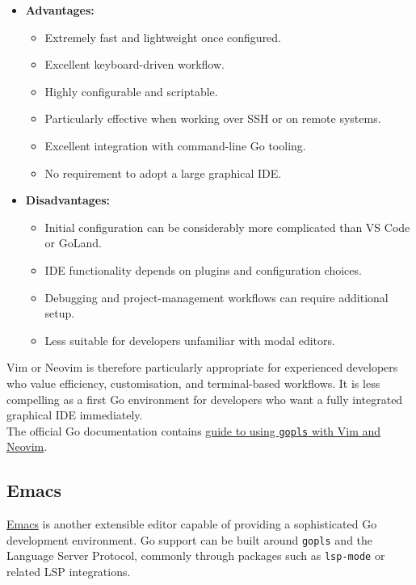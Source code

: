 \begin{itemize}
\item \textbf{Advantages:}
\begin{itemize}
\item Extremely fast and lightweight once configured.
\item Excellent keyboard-driven workflow.
\item Highly configurable and scriptable.
\item Particularly effective when working over SSH or on remote systems.
\item Excellent integration with command-line Go tooling.
\item No requirement to adopt a large graphical IDE.
\end{itemize}

\item \textbf{Disadvantages:}
\begin{itemize}
    \item Initial configuration can be considerably more complicated than VS Code or GoLand.
    \item IDE functionality depends on plugins and configuration choices.
    \item Debugging and project-management workflows can require additional setup.
    \item Less suitable for developers unfamiliar with modal editors.
\end{itemize}

\end{itemize}

Vim or Neovim is therefore particularly appropriate for experienced developers who value efficiency, customisation, and terminal-based workflows. It is less compelling as a first Go environment for developers who want a fully integrated graphical IDE immediately.\\

The official Go documentation contains 
\href{https://go.dev/gopls/editor/vim}{guide to using \texttt{gopls} with Vim and Neovim}.

\subsection{Emacs}

\href{https://www.gnu.org/software/emacs/}{Emacs} is another extensible editor capable of providing a sophisticated Go development environment. Go support can be built around \texttt{gopls} and the Language Server Protocol, commonly through packages such as \texttt{lsp-mode} or related LSP integrations.\\

